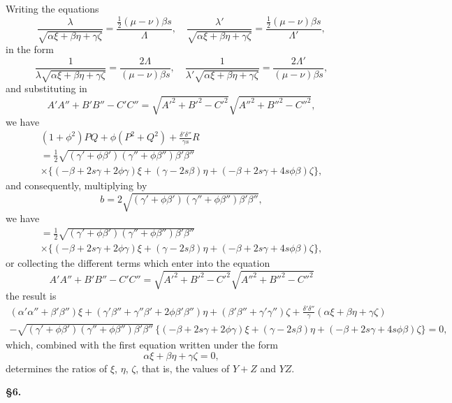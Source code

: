 \documentclass[11pt,a4paper]{book}
\begin{document}
Writing the equations
\[
\frac{\lambda}{\sqrt{\alpha\xi+\beta\eta+\gamma\zeta}} = \frac{\tfrac{1}{2}(\mu-\nu)\beta s}{\Lambda}, \quad \frac{\lambda'}{\sqrt{\alpha\xi+\beta\eta+\gamma\zeta}} = \frac{\tfrac{1}{2}(\mu-\nu)\beta s}{\Lambda'},
\]
in the form
\[
\frac{1}{\lambda\sqrt{\alpha\xi+\beta\eta+\gamma\zeta}} = \frac{2\Lambda}{(\mu-\nu)\beta s}, \quad \frac{1}{\lambda'\sqrt{\alpha\xi+\beta\eta+\gamma\zeta}} = \frac{2\Lambda'}{(\mu-\nu)\beta s},
\]
and substituting in
\[
A'A''+B'B''-C'C'' = \sqrt{A'^2+B'^2-C'^2}\sqrt{A''^2+B''^2-C''^2},
\]
we have
\begin{multline*}
(1+\phi^2)PQ + \phi(P^2+Q^2) + \tfrac{\delta'\delta''}{\gamma s}R \\
= \tfrac{1}{2}\sqrt{(\gamma'+\phi\beta')(\gamma''+\phi\beta'')\beta'\beta''} \\
\times \{(-\beta+2s\gamma+2\phi\gamma)\xi + (\gamma-2s\beta)\eta + (-\beta+2s\gamma+4s\phi\beta)\zeta\},
\end{multline*}
and consequently, multiplying by
\[
b = 2\sqrt{(\gamma'+\phi\beta')(\gamma''+\phi\beta'')\beta'\beta''},
\]
we have
\begin{multline*}
= \tfrac{1}{2}\sqrt{(\gamma'+\phi\beta')(\gamma''+\phi\beta'')\beta'\beta''} \\
\times \{(-\beta+2s\gamma+2\phi\gamma)\xi + (\gamma-2s\beta)\eta + (-\beta+2s\gamma+4s\phi\beta)\zeta\},
\end{multline*}
or collecting the different terms which enter into the equation
\[
A'A''+B'B''-C'C'' = \sqrt{A'^2+B'^2-C'^2}\sqrt{A''^2+B''^2-C''^2}
\]
the result is
\begin{multline*}
(\alpha'\alpha''+\beta'\beta'')\xi + (\gamma'\beta''+\gamma''\beta'+2\phi\beta'\beta'')\eta + (\beta'\beta''+\gamma'\gamma'')\zeta + \tfrac{\delta'\delta''}{\gamma}(\alpha\xi+\beta\eta+\gamma\zeta)\\
- \sqrt{(\gamma'+\phi\beta')(\gamma''+\phi\beta'')\beta'\beta''}\,\{(-\beta+2s\gamma+2\phi\gamma)\xi+(\gamma-2s\beta)\eta+(-\beta+2s\gamma+4s\phi\beta)\zeta\} = 0,
\end{multline*}
which, combined with the first equation written under the form
\[
\alpha\xi+\beta\eta+\gamma\zeta = 0,
\]
determines the ratios of $\xi$, $\eta$, $\zeta$, that is, the values of $Y+Z$ and $YZ$.

\newpage
\setcounter{page}{73}

\noindent\textbf{\S 6.}
\end{document}
